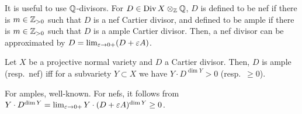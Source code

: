 \documentclass{../../small}
\DeclareMathOperator{\Div}{Div}
\begin{document}
\begin{rmk}
It is useful to use $\mathbb{Q}$-divisors.
For $D\in\Div X\otimes_\Z\Q$, $D$ is defined to be nef if there is $m\in\mathbb{Z}_{>0}$ such that $D$ is a nef Cartier divisor, and defined to be ample if there is $m\in\mathbb{Z}_{>0}$ such that $D$ is a ample Cartier divisor.
Then, a nef divisor can be approximated by $D=\lim_{\varepsilon\to0+}(D+\varepsilon A)$.
\end{rmk}

\begin{thm}
Let $X$ be a projective normal variety and $D$ a Cartier divisor.
Then, $D$ is ample (resp.~nef) iff for a subvariety $Y\subset X$ we have $Y\cdot D^{\dim Y}>0$ (resp.~$\ge0$).
\end{thm}
\begin{pf}
For amples, well-known.
For nefs, it follows from $Y\cdot D^{\dim Y}=\lim_{\varepsilon\to0+}Y\cdot(D+\varepsilon A)^{\dim Y}\ge0$.
\end{pf}
\end{document}
